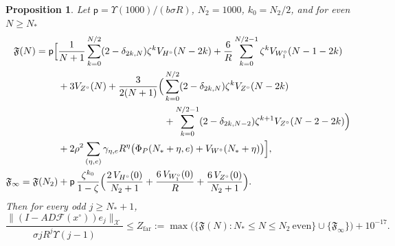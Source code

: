 \documentclass[11pt]{amsart}
\newtheorem{proposition}[theorem]{Proposition}
\theoremstyle{definition}
\theoremstyle{remark}
\numberwithin{equation}{section}
\newcommand{\Fc}{\mathcal{F}}
\newcommand{\nrm}[1]{\lVert #1\rVert}
\begin{document}
\begin{proposition}\label{r5:prop-far}
Let $\mathsf p=\Upsilon(1000)/(b\sigma R)$, $N_2=1000$, $k_0=N_2/2$, and for even $N\geq N_*$
\begin{align*}
\mathfrak F(N)=\mathsf p\Big[&\frac1{N+1}\sum_{k=0}^{N/2}(2-\delta_{2k,N})\zeta^kV_{H^\circ}(N-2k)+\frac6R\sum_{k=0}^{N/2-1}\zeta^kV_{W^\circ_1}(N-1-2k)\\
&+3V_{Z^\circ}(N)
+\frac3{2(N+1)}\Big(\sum_{k=0}^{N/2}(2-\delta_{2k,N})\zeta^kV_{Z^\circ}(N-2k)\\
&\hphantom{{}+3V_{Z^\circ}(N)+\frac3{2(N+1)}\Big(}+\sum_{k=0}^{N/2-1}(2-\delta_{2k,N-2})\zeta^{k+1}V_{Z^\circ}(N-2-2k)\Big)\\
&+2\rho^2\sum_{(\eta,e)}\gamma_{\eta,e}R^\eta\big(\Phi_P(N_*+\eta,e)+V_{W^\circ}(N_*+\eta)\big)\Big],\\
\mathfrak F_\infty=\mathfrak F(N_2)&+\mathsf p\,\frac{\zeta^{k_0}}{1-\zeta}\Big(\frac{2\,V_{H^\circ}(0)}{N_2+1}+\frac{6\,V_{W^\circ_1}(0)}R+\frac{6\,V_{Z^\circ}(0)}{N_2+1}\Big).
\end{align*}
Then for every odd $j\geq N_*+1$,
\[
\frac{\nrm{(I-AD\Fc(x^\circ))e_j}_{\mathcal X}}{\sigma jR^j\Upsilon(j-1)}\leq Z_{\mathrm{far}}:=\max\big(\{\mathfrak F(N):N_*\leq N\leq N_2\ \text{even}\}\cup\{\mathfrak F_\infty\}\big)+10^{-17}.
\]
\end{proposition}
\end{document}
